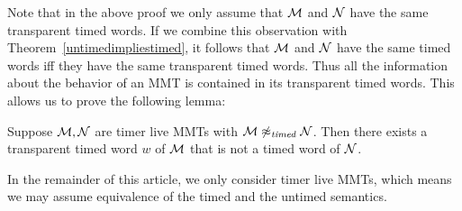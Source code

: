 Note that in the above proof we only assume that ${\mathcal M}$ and ${\mathcal N}$ have the same transparent timed words. 
If we combine this observation with Theorem~\ref{untimedimpliestimed}, it follows that
${\mathcal M}$ and ${\mathcal N}$ have the same timed words iff they have the same transparent timed words. 
Thus all the information about the behavior of an MMT is contained in its transparent timed words.
This allows us to prove the following lemma:
\fi

\begin{lemma}
\label{not timed}
Suppose ${\mathcal M}, {\mathcal N}$ are timer live MMTs with ${\mathcal M} \not\approx_{\mathit{timed}} {\mathcal N}$.
Then there exists a transparent timed word $w$ of ${\mathcal M}$ that is not a timed word of ${\mathcal N}$.
\end{lemma}

In the remainder of this article, we only consider timer live MMTs,
which means we may assume equivalence of the timed and the untimed semantics.

